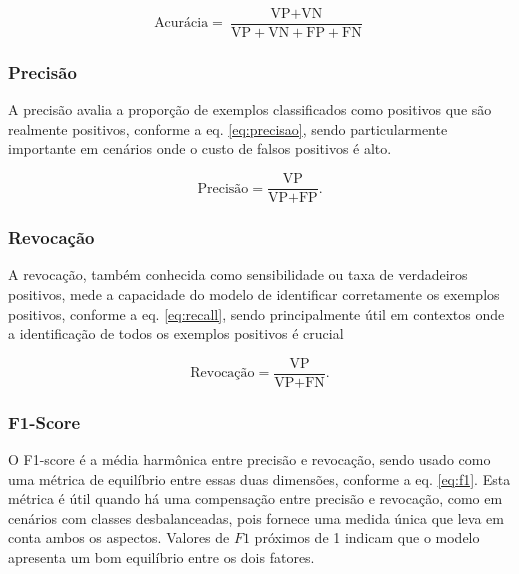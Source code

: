 \begin{equation}\label{eq:acc}
  \text{Acurácia} = \frac{\text{VP} + \text{VN}}{\text{VP} + \text{VN} + \text{FP} + \text{FN}}
\end{equation}



\subsubsection{Precisão}
\label{sec:metricas-precisao}

A precisão avalia a proporção de exemplos classificados como positivos que são realmente positivos, conforme a eq. \eqref{eq:precisao}, sendo particularmente importante em cenários onde o custo de falsos positivos é alto.

\begin{equation}\label{eq:precisao}
  \text{Precisão} = \frac{\text{VP}}{\text{VP} + \text{FP}}.
\end{equation}




\subsubsection{Revocação}
\label{sec:metricas-revocacao}

A revocação, também conhecida como sensibilidade ou taxa de verdadeiros positivos, mede a capacidade do modelo de identificar corretamente os exemplos positivos, conforme a eq. \eqref{eq:recall}, sendo principalmente útil em contextos onde a identificação de todos os exemplos positivos é crucial

\begin{equation}\label{eq:recall}
  \text{Revocação} = \frac{\text{VP}}{\text{VP} + \text{FN}}.
\end{equation}




\subsubsection{F1-Score}
\label{sec:metricas-f1}

O F1-score é a média harmônica entre precisão e revocação, sendo usado como uma métrica de equilíbrio entre essas duas dimensões, conforme a eq. \eqref{eq:f1}. Esta métrica é útil quando há uma compensação entre precisão e revocação, como em cenários com classes desbalanceadas, pois fornece uma medida única que leva em conta ambos os aspectos. Valores de \( F1 \) próximos de 1 indicam que o modelo apresenta um bom equilíbrio entre os dois fatores.

